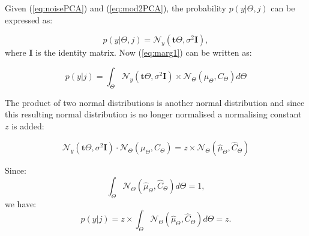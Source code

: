Given (\ref{eq:noisePCA}) and (\ref{eq:mod2PCA}), the probability $p(y|\Theta,j)$ can be expressed as:

\begin{equation}\label{eq:probybeta}
p(y|\Theta,j) = \mathcal{N}_y(\textbf{t}\Theta,\sigma^2\textbf{I}),
\end{equation}
where $\textbf{I}$ is the identity matrix.
Now (\ref{eq:marg1}) can be written as:

\begin{equation}\label{eq:marg2}
p(y|j) = \int_\Theta \mathcal{N}_y(\textbf{t}\Theta,\sigma^2 \textbf{I})\times\mathcal{N}_\Theta(\mu_\Theta,C_\Theta) d\Theta
\end{equation}

The product of two normal distributions is another normal distribution and since this resulting normal distribution is no longer normalised a normalising constant $z$ is added:

\begin{equation}\label{eq:prod1}
\mathcal{N}_y(\textbf{t}\Theta,\sigma^2 \textbf{I})\cdot\mathcal{N}_\Theta(\mu_\Theta,C_\Theta) = z \times \mathcal{N}_\Theta(\hat{\mu}_\Theta,\hat{C}_\Theta)
\end{equation}

Since:
\begin{equation}\label{eq:marg3}
\int_\Theta \mathcal{N}_\Theta(\hat{\mu}_\Theta,\hat{C}_\Theta) d\Theta = 1,
\end{equation}
we have:
\begin{equation}\label{eq:marg4}
p(y|j) = z \times \int_\Theta \mathcal{N}_\Theta(\hat{\mu}_\Theta,\hat{C}_\Theta) d\Theta = z.
\end{equation}

